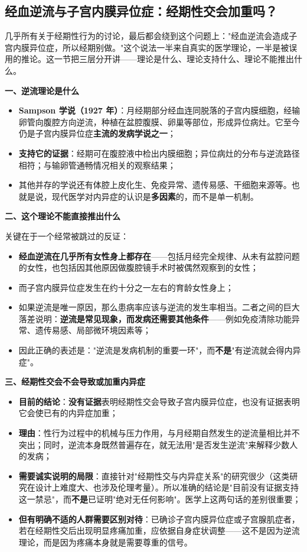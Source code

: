 \subsection{经血逆流与子宫内膜异位症：经期性交会加重吗？}

几乎所有关于经期性行为的讨论，最后都会绕到这个问题上："经血逆流会造成子宫内膜异位症，所以经期别做。"这个说法一半来自真实的医学理论，一半是被误用的推论。这一节把三层分开讲——理论是什么、理论支持什么、理论不能推出什么。

\textbf{一、逆流理论是什么}

\begin{itemize}
\item \textbf{Sampson 学说（1927 年）}：月经期部分经血连同脱落的子宫内膜细胞，经输卵管向腹腔方向逆流，种植在盆腔腹膜、卵巢等部位，形成异位病灶。它至今仍是子宫内膜异位症\textbf{主流的发病学说之一}；
\item \textbf{支持它的证据}：经期可在腹腔液中检出内膜细胞；异位病灶的分布与逆流路径相符；与输卵管通畅情况相关的观察结果；
\item 其他并存的学说还有体腔上皮化生、免疫异常、遗传易感、干细胞来源等。也就是说，现代医学对内异症的认识是\textbf{多因素}的，而不是单一机制。
\end{itemize}

\textbf{二、这个理论不能直接推出什么}

关键在于一个经常被跳过的反证：

\begin{itemize}
\item \textbf{经血逆流在几乎所有女性身上都存在}——包括月经完全规律、从未有盆腔问题的女性，也包括因其他原因做腹腔镜手术时被偶然观察到的女性；
\item 而子宫内膜异位症发生在约十分之一左右的育龄女性身上；
\item 如果逆流是唯一原因，那么患病率应该与逆流的发生率相当。二者之间的巨大落差说明：\textbf{逆流是常见现象，而发病还需要其他条件}——例如免疫清除功能异常、遗传易感、局部微环境因素等；
\item 因此正确的表述是："逆流是发病机制的重要一环"，而\textbf{不是}"有逆流就会得内异症"。
\end{itemize}

\textbf{三、经期性交会不会导致或加重内异症}

\begin{itemize}
\item \textbf{目前的结论}：\textbf{没有证据}表明经期性交会导致子宫内膜异位症，也没有证据表明它会使已有的内异症加重；
\item \textbf{理由}：性行为过程中的机械与压力作用，与月经期自然发生的逆流量相比并不突出；同时，逆流本身既然普遍存在，就无法用"是否发生逆流"来解释少数人的发病；
\item \textbf{需要诚实说明的局限}：直接针对"经期性交与内异症关系"的研究很少（这类研究在设计上难度大、也涉及伦理考量）。所以准确的结论是"目前没有证据支持这一禁忌"，而\textbf{不是}已证明"绝对无任何影响"。医学上这两句话的差别很重要；
\item \textbf{但有明确不适的人群需要区别对待}：已确诊子宫内膜异位症或子宫腺肌症者，若在经期性交后出现明显疼痛加重，应依据自身症状调整——这不是因为逆流理论，而是因为疼痛本身就是需要尊重的信号。
\end{itemize}

